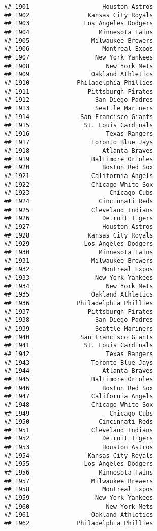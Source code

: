\documentclass[]{article}
\begin{document}
\begin{verbatim}
## 1901                    Houston Astros
## 1902                Kansas City Royals
## 1903               Los Angeles Dodgers
## 1904                   Minnesota Twins
## 1905                 Milwaukee Brewers
## 1906                    Montreal Expos
## 1907                  New York Yankees
## 1908                     New York Mets
## 1909                 Oakland Athletics
## 1910             Philadelphia Phillies
## 1911                Pittsburgh Pirates
## 1912                  San Diego Padres
## 1913                  Seattle Mariners
## 1914              San Francisco Giants
## 1915               St. Louis Cardinals
## 1916                     Texas Rangers
## 1917                 Toronto Blue Jays
## 1918                    Atlanta Braves
## 1919                 Baltimore Orioles
## 1920                    Boston Red Sox
## 1921                 California Angels
## 1922                 Chicago White Sox
## 1923                      Chicago Cubs
## 1924                   Cincinnati Reds
## 1925                 Cleveland Indians
## 1926                    Detroit Tigers
## 1927                    Houston Astros
## 1928                Kansas City Royals
## 1929               Los Angeles Dodgers
## 1930                   Minnesota Twins
## 1931                 Milwaukee Brewers
## 1932                    Montreal Expos
## 1933                  New York Yankees
## 1934                     New York Mets
## 1935                 Oakland Athletics
## 1936             Philadelphia Phillies
## 1937                Pittsburgh Pirates
## 1938                  San Diego Padres
## 1939                  Seattle Mariners
## 1940              San Francisco Giants
## 1941               St. Louis Cardinals
## 1942                     Texas Rangers
## 1943                 Toronto Blue Jays
## 1944                    Atlanta Braves
## 1945                 Baltimore Orioles
## 1946                    Boston Red Sox
## 1947                 California Angels
## 1948                 Chicago White Sox
## 1949                      Chicago Cubs
## 1950                   Cincinnati Reds
## 1951                 Cleveland Indians
## 1952                    Detroit Tigers
## 1953                    Houston Astros
## 1954                Kansas City Royals
## 1955               Los Angeles Dodgers
## 1956                   Minnesota Twins
## 1957                 Milwaukee Brewers
## 1958                    Montreal Expos
## 1959                  New York Yankees
## 1960                     New York Mets
## 1961                 Oakland Athletics
## 1962             Philadelphia Phillies

\end{verbatim}
\end{document}
